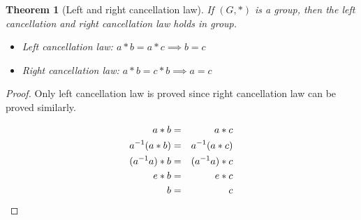 \documentclass{article}
\theoremstyle{MyNonumberplain}
\theoremstyle{break}
\newtheorem*{proof}{Proof. }
\theoremstyle{break}
\newtheorem{theorem}{Theorem}[section]
\theoremstyle{break}
\theoremstyle{definition}
\theoremstyle{break}
\begin{document}
\begin{thmbox}
    \begin{theorem}[Left and right cancellation law]
        If $(G, \ast)$ is a group, then the left cancellation and right cancellation law holds in group.\\
        \begin{itemize}
            \item Left cancellation law: $a*b=a*c\implies b=c$
            \item Right cancellation law: $a*b=c*b\implies a=c$
        \end{itemize}
    \end{theorem}
    \begin{prfbox}
        \begin{proof}
            Only left cancellation law is proved since right cancellation law can be proved similarly.
    
            \begin{eqnarray}
                a \ast b & = & a \ast c\nonumber\\
                a^{- 1} (a \ast b) & = & a^{- 1} (a \ast c)\nonumber\\
                (a^{- 1} a) \ast b & = & (a^{- 1} a) \ast c \hspace*{\fill}
                \nonumber\\
                e \ast b & = & e \ast c \hspace*{\fill} \nonumber\\
                b & = & c \hspace*{\fill}  \nonumber
              \end{eqnarray}
        \end{proof}
    \end{prfbox}
    
\end{thmbox}
\end{document}
